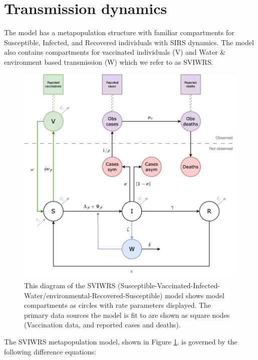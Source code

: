 \documentclass[
]{book}
\begin{document}
\section{Transmission dynamics}\label{transmission-dynamics}

The model has a metapopulation structure with familiar compartments for Susceptible, Infected, and Recovered individuals with SIRS dynamics. The model also contains compartments for vaccinated individuals (V) and Water \& environment based transmission (W) which we refer to as SVIWRS.

\begin{figure}

{\centering \includegraphics[width=0.95\linewidth]{diagrams/v_0_1.drawio} 

}

\caption{This diagram of the SVIWRS (Susceptible-Vaccinated-Infected-Water/environmental-Recovered-Susceptible) model shows model compartments as circles with rate parameters displayed. The primary data sources the model is fit to are shown as square nodes (Vaccination data, and reported cases and deaths).}\label{fig:diagram}
\end{figure}

The SVIWRS metapopulation model, shown in Figure \ref{fig:diagram}, is governed by the following difference equations:
\end{document}
